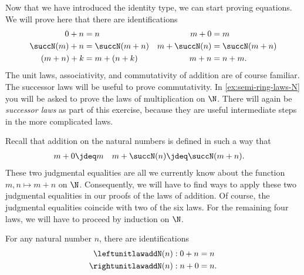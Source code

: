 Now that we have introduced the identity type, we can start proving equations. We will prove here that there are identifications
\begin{align*}
  0+n & = n & m+0 & = m \\
  \succN(m)+n & = \succN(m+n) & m+\succN(n) & = \succN(m+n) \\
  (m+n)+k & = m+(n+k) & m+n & = n+m.
\end{align*}
The unit laws, associativity, and commutativity of addition are of course familiar. The successor laws will be useful to prove commutativity. In \cref{ex:semi-ring-laws-N} you will be asked to prove the laws of multiplication on $\N$. There will again be \emph{successor laws} as part of this exercise, because they are useful intermediate steps in the more complicated laws.

Recall that addition on the natural numbers is defined in such a way that
\begin{align*}
  m+0 & \jdeq m & m+\succN(n) & \jdeq \succN(m+n).
\end{align*}
These two judgmental equalities are all we currently know about the function $m,n\mapsto m+n$ on $\N$. Consequently, we will have to find ways to apply these two judgmental equalities in our proofs of the laws of addition. Of course, the judgmental equalities coincide with two of the six laws. For the remaining four laws, we will have to proceed by induction on $\N$.

\begin{prp}\label{prp:unit-laws-add-N}
  For any natural number $n$, there are identifications
  \begin{align*}
    \leftunitlawaddN(n) & : 0+n=n \\
    \rightunitlawaddN(n) & : n+0=n.
  \end{align*}
\end{prp}

